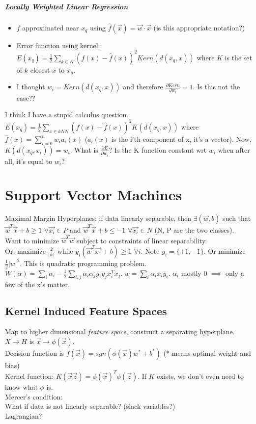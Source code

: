\documentclass[11pt]{article}
\begin{document}
\subparagraph{Locally Weighted Linear Regression}
\begin{itemize}
\item $f$ approximated near $x_q$ using $\hat{f}(\vec{x}) = \vec{w} \cdot \vec{x}$ (is this appropriate notation?)
\item Error function using kernel: $E(x_q) = \frac12 \sum_{k\in K}{(f(x) - \hat{f}(x))^2 Kern(d(x_q, x))}$ where $K$ is the set of $k$ closest $x$ to $x_q$.
\item I thought $w_i = Kern(d(x_q, x))$ and therefore $\frac{\partial Kern}{\partial w_i} =1$. Is this not the case??
\end{itemize}
I think I have a stupid calculus question. $E(x_q) = \frac12 \sum_{x \in kNN}{(f(x)-\hat{f}(x))^2K(d(x_q, x))}$ where $\hat{f}(x) = \sum_{i=0}^n w_i a_i(x)$ ($a_i(x)$ is the i'th component of x, it's a vector). Now, $K(d(x_q,x_i))=w_i$. What is $\frac{\partial E}{\partial w_i}$? Is the K function constant wrt $w_i$ when after all, it's equal to $w_i$?


\section{Support Vector Machines}
Maximal Margin Hyperplanes: if data linearly separable, then $\exists (\vec{w}, b)$ such that $\vec{w}^T\vec{x} + b \geq 1$ $\forall \vec{x_i} \in P$ and $\vec{w}^T\vec{x} + b \leq -1$ $\forall \vec{x_i} \in N$ (N, P are the two classes). Want to minimize $\vec{w}^T\vec{w}$ subject to constraints of linear separability.\\ Or, maximize $\frac2{|w|}$ while $y_i(\vec{w}^T\vec{x_1}+b) \geq 1$ $\forall i$. Note $y_i =\{+1, -1\}$. Or minimize $\frac12 |w|^2$. This is quadratic programming problem.\\
$W(\alpha) = \sum_{i} \alpha_i - \frac12 \sum_{i,j} \alpha_i \alpha_j y_i y_j x_i^T x_j$. $w = \sum_i \alpha_i x_i y_i$. $\alpha_i$ mostly 0 $\implies$ only a few of the x's matter.
\subsection{Kernel Induced Feature Spaces}
Map to higher dimensional \textit{feature space}, construct a separating hyperplane. $X \rightarrow H$ is $\vec{x} \rightarrow \phi(\vec{x}).$\\
Decision function is $f(\vec{x}) = sgn (\phi(\vec{x}) w^*+b^*)$ (* means optimal weight and bias)\\
Kernel function: $K(\vec{x} \vec{z}) =\phi(\vec{x})^T\phi(\vec{z})$. If $K$ exists, we don't even need to know what $\phi$ is.\\
Mercer's condition: \\
What if data is not linearly separable? (slack variables?)\\
Lagrangian?\\
\end{document}
